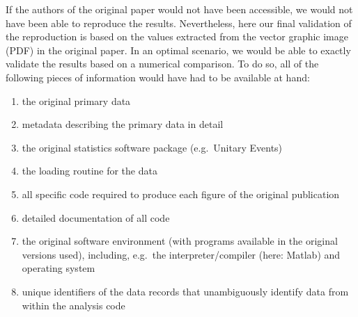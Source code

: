 \documentclass[10pt,a4paper,onecolumn]{article}
\begin{document}
If the authors of the original paper would not have been accessible, we
would not have been able to reproduce the results. Nevertheless, here
our final validation of the reproduction is based on the values
extracted from the vector graphic image (PDF) in the original paper. In
an optimal scenario, we would be able to exactly validate the results
based on a numerical comparison. To do so, all of the following pieces
of information would have had to be available at hand:

\begin{enumerate}
\def\labelenumi{\arabic{enumi}.}
\item
  the original primary data
\item
  metadata describing the primary data in detail
\item
  the original statistics software package (e.g.~Unitary Events)
\item
  the loading routine for the data
\item
  all specific code required to produce each figure of the original
  publication
\item
  detailed documentation of all code
\item
  the original software environment (with programs available in the
  original versions used), including, e.g.~the interpreter/compiler
  (here: Matlab) and operating system
\item
  unique identifiers of the data records that unambiguously identify
  data from within the analysis code
\end{enumerate}
\end{document}
